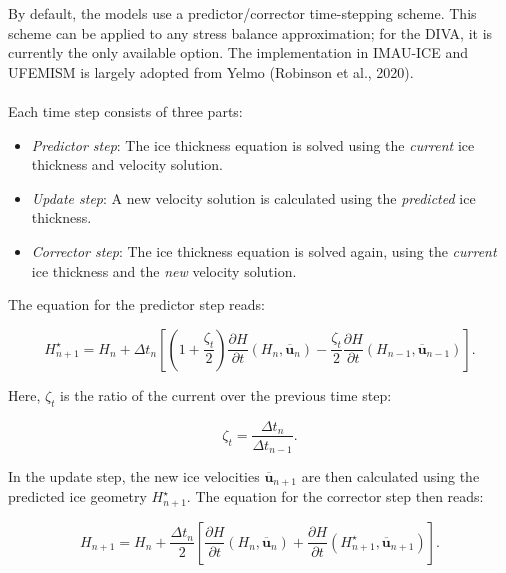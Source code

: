 \documentclass{article}
\begin{document}
By default, the models use a predictor/corrector time-stepping scheme. This scheme can be applied to any stress balance approximation; for the DIVA, it is currently the only available option. The implementation in IMAU-ICE and UFEMISM is largely adopted from Yelmo (Robinson et al., 2020).\\
\\
Each time step consists of three parts:

\begin{itemize}
\item \textit{Predictor step}: The ice thickness equation is solved using the \textit{current} ice thickness and velocity solution.
\item \textit{Update step}: A new velocity solution is calculated using the \textit{predicted} ice thickness.
\item \textit{Corrector step}: The ice thickness equation is solved again, using the \textit{current} ice thickness and the \textit{new} velocity solution.
\end{itemize}

The equation for the predictor step reads:

\begin{equation} \label{eq:timestep_03}
H_{n+1}^{\star} = H_n + \Delta t_n \left[ { 
\left( 1 + \frac{\zeta_t}{2} \right) \frac{\partial H}{\partial t} \left( H_n, \overline{\textbf{u}}_n \right)
- \frac{\zeta_t}{2} \frac{\partial H}{\partial t} \left( H_{n-1}, \overline{\textbf{u}}_{n-1} \right) } \right].
\end{equation}

Here, $\zeta_t$ is the ratio of the current over the previous time step:

\begin{equation} \label{eq:timestep_04}
\zeta_t = \frac{\Delta t_n}{\Delta t_{n-1}}.
\end{equation}

In the update step, the new ice velocities $\overline{\textbf{u}}_{n+1}$ are then calculated using the predicted ice geometry $H_{n+1}^{\star}$. The equation for the corrector step then reads:

\begin{equation} \label{eq:timestep_05}
H_{n+1} = H_n + \frac{\Delta t_n}{2} \left[ 
\frac{\partial H}{\partial t} \left( H_n, \overline{\textbf{u}}_n \right) +
\frac{\partial H}{\partial t} \left( H_{n+1}^{\star}, \overline{\textbf{u}}_{n+1} \right)
\right].
\end{equation}
\end{document}
